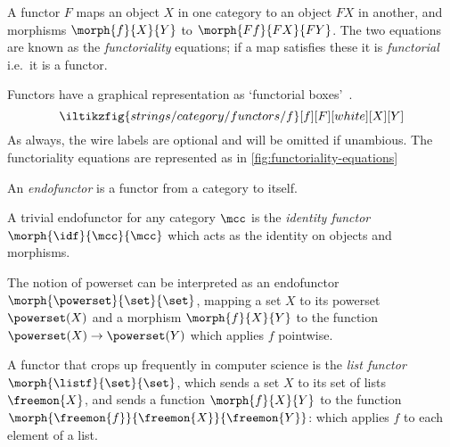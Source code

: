 A functor \(F\) maps an object \(X\) in one category to an object \(FX\) in
another, and morphisms \(\morph{f}{X}{Y}\) to \(\morph{Ff}{FX}{FY}\).
The two equations are known as the \emph{functoriality} equations; if a map
satisfies these it is \emph{functorial} i.e.\ it is a functor.

Functors have a graphical representation as `functorial
boxes'~\cite{mellies2006functorial}.
\[
    \iltikzfig{strings/category/functors/f}[f][F][white][X][Y]
\]
As always, the wire labels are optional and will be omitted if unambious.
The functoriality equations are represented as in
\cref{fig:functoriality-equations}



\begin{definition}[Endofunctor]
    An \emph{endofunctor} is a functor from a category to itself.
\end{definition}

\begin{example}
    A trivial endofunctor for any category \(\mcc\) is the
    \emph{identity functor} \(\morph{\idf}{\mcc}{\mcc}\) which acts as the
    identity on objects and morphisms.
\end{example}

\begin{example}
    The notion of powerset can be interpreted as an endofunctor \(
        \morph{\powerset}{\set}{\set}
    \), mapping a set \(X\) to its powerset \(\powerset(X)\) and a morphism
    \(\morph{f}{X}{Y}\) to the function \(\powerset(X) \to \powerset(Y)\) which
    applies \(f\) pointwise.
\end{example}

\begin{example}\label{ex:list-functor}
    A functor that crops up frequently in computer science is the
    \emph{list functor} \(\morph{\listf}{\set}{\set}\), which sends a set
    \(X\) to its set of lists \(\freemon{X}\), and sends a function
    \(\morph{f}{X}{Y}\) to the function
    \(\morph{\freemon{f}}{\freemon{X}}{\freemon{Y}}\): which applies \(f\)
    to each element of a list.
\end{example}

